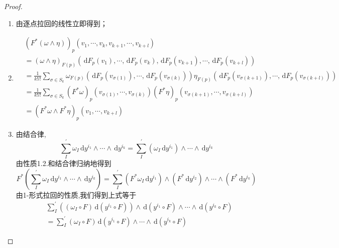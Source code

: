 \documentclass[../../几何与拓扑.tex]{subfiles}
\begin{document}
\begin{proof}
    \begin{enumerate}
        \item 由逐点拉回的线性立即得到；
        \item  $$
       \begin{aligned}
       &  \left( F^{*}\left( \omega \wedge \eta  \right)   \right)_{p}\left(  v_1,\cdots,v_k  ,v_{k+ 1},\cdots ,v_{k+ l}\right) \\ 
         & = \left( \omega \wedge  \eta  \right)_{F\left( p \right) }  \left( \,\mathrm{d} F_{p}\left( v_1 \right),\cdots ,\,\mathrm{d} F_{p}\left( v_{k} \right) ,\,\mathrm{d} F_{p}\left( v_{k+ 1} \right),\cdots ,  \,\mathrm{d} F_{p}\left( v_{k+ l} \right)  \right)\\ 
         & =  \frac{1}{k!l!} \sum _{\sigma  \in S_{k}} \omega_{F\left( p \right) } \left( \,\mathrm{d} F_{p}\left( v_{\sigma \left( 1 \right) }  \right)  ,\cdots ,\,\mathrm{d} F_{p} \left( v_{\sigma \left( k \right) } \right)\right) \eta_{F\left( p \right) } \left( \,\mathrm{d} F_{p}\left( v_{\sigma \left( k+ 1 \right) } \right) ,\cdots ,\,\mathrm{d} F_{p}\left( v_{\sigma \left( k+l \right) } \right)   \right) \\ 
          & = \frac{1}{k!l!} \sum _{\sigma  \in S_{k}} \left( F^{*}\omega  \right)_{p}\left( v_{\sigma \left( 1 \right) } ,\cdots ,v_{\sigma \left( k \right) }\right)  \left( F^{*}\eta  \right)_{p}\left( v_{\sigma \left( k+ 1 \right) },\cdots ,v_{\sigma \left( k+ l \right) } \right)  \\ 
           & = \left( F^{*}\omega \wedge F^{*}\eta  \right)_{p} \left( v_1,\cdots ,v_{k+ l} \right)  
       \end{aligned}
        $$
        \item 由结合律, $$
        \sum _{I}^{\prime}  \omega _{I} \,\mathrm{d} y^{i_1}\wedge \cdots \wedge \,\mathrm{d} y^{i_{k}} = \sum _{I}^{\prime}  \left( \omega _{I} \,\mathrm{d} y^{i_1} \right)\wedge \cdots \wedge \,\mathrm{d} y^{i_{k}} 
        $$由性质1.2.和结合律归纳地得到 $$
        F^{*}\left( \sum _{I}^{\prime} \omega _{I} \,\mathrm{d} y^{i_1}\wedge \cdots \wedge  \,\mathrm{d} y^{i_{k}}  \right) = \sum _{I}^{\prime}  \left( F^{*}\omega _{I}\,\mathrm{d} y^{i_1} \right)\wedge \left( F^{*} \,\mathrm{d} y^{i_2} \right)\wedge \cdots \wedge \left( F^{*}\,\mathrm{d} y^{i_{k}} \right)   
        $$由1-形式拉回的性质,我们得到上式等于 $$
       \begin{aligned}
       &   \sum _{I}^{\prime} \left( \left( \omega _{I}\circ F \right)  \,\mathrm{d} \left( y^{i_1}\circ F \right)  \right) \wedge \,\mathrm{d} \left( y^{i_1}\circ F \right)\wedge \cdots \wedge  \,\mathrm{d} \left( y^{i_{k}}\circ F \right)   \\ 
        & = \sum _{I}^{\prime} \left( \omega _{I}\circ F \right) \,\mathrm{d} \left( y^{i_1}\circ F \right)\wedge \cdots \wedge \,\mathrm{d} \left( y^{i_{k}}\circ F \right)    
       \end{aligned}
        $$
    \end{enumerate}
    
\end{proof}
\end{document}
